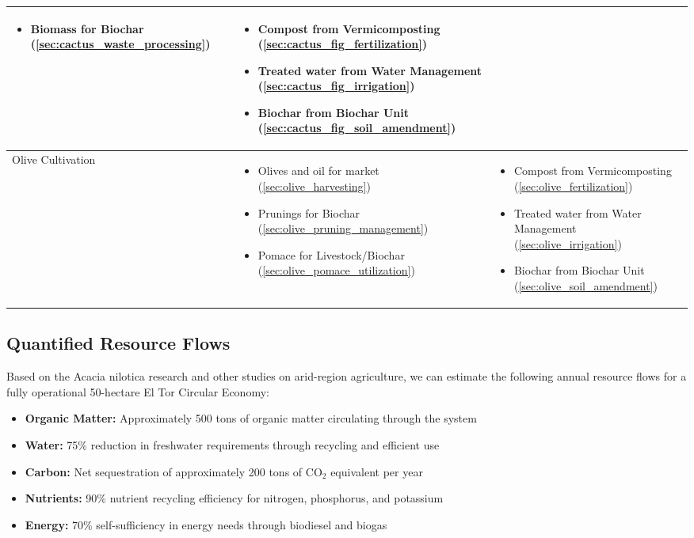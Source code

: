 \begin{table}[h]
\begin{tabular}{|p{2.5cm}|p{5cm}|p{5cm}|}
\begin{itemize}
    \item Biomass for Biochar (\ref{sec:cactus_waste_processing})
\end{itemize} & 
\begin{itemize}
    \item Compost from Vermicomposting (\ref{sec:cactus_fig_fertilization})
    \item Treated water from Water Management (\ref{sec:cactus_fig_irrigation})
    \item Biochar from Biochar Unit (\ref{sec:cactus_fig_soil_amendment})
\end{itemize} \\
\hline
Olive Cultivation & 
\begin{itemize}
    \item Olives and oil for market (\ref{sec:olive_harvesting})
    \item Prunings for Biochar (\ref{sec:olive_pruning_management})
    \item Pomace for Livestock/Biochar (\ref{sec:olive_pomace_utilization})
\end{itemize} & 
\begin{itemize}
    \item Compost from Vermicomposting (\ref{sec:olive_fertilization})
    \item Treated water from Water Management (\ref{sec:olive_irrigation})
    \item Biochar from Biochar Unit (\ref{sec:olive_soil_amendment})
\end{itemize} \\
\hline
\end{tabular}
\end{table}

\subsection{Quantified Resource Flows}

Based on the Acacia nilotica research and other studies on arid-region agriculture, we can estimate the following annual resource flows for a fully operational 50-hectare El Tor Circular Economy:

\begin{itemize}
    \item \textbf{Organic Matter:} Approximately 500 tons of organic matter circulating through the system
    \item \textbf{Water:} 75\% reduction in freshwater requirements through recycling and efficient use
    \item \textbf{Carbon:} Net sequestration of approximately 200 tons of CO$_2$ equivalent per year
    \item \textbf{Nutrients:} 90\% nutrient recycling efficiency for nitrogen, phosphorus, and potassium
    \item \textbf{Energy:} 70\% self-sufficiency in energy needs through biodiesel and biogas
\end{itemize}

